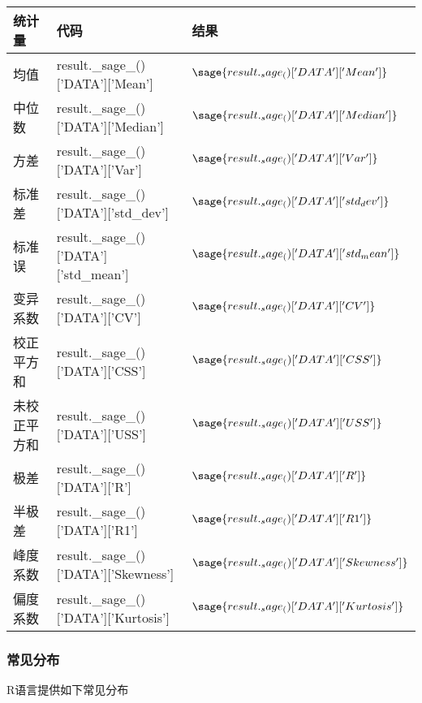 \begin{tabular}{lll}
\hline
统计量 & 代码 & 结果 \\
\hline
均值 & result.\_sage\_()['DATA']['Mean'] & $\sage{result._sage_()['DATA']['Mean']}$ \\
中位数 & result.\_sage\_()['DATA']['Median'] & $\sage{result._sage_()['DATA']['Median']}$ \\
方差 & result.\_sage\_()['DATA']['Var'] & $\sage{result._sage_()['DATA']['Var']}$ \\
标准差 & result.\_sage\_()['DATA']['std\_dev'] & $\sage{result._sage_()['DATA']['std_dev']}$ \\
标准误 & result.\_sage\_()['DATA']['std\_mean'] & $\sage{result._sage_()['DATA']['std_mean']}$ \\
变异系数 & result.\_sage\_()['DATA']['CV'] & $\sage{result._sage_()['DATA']['CV']}$ \\
校正平方和 & result.\_sage\_()['DATA']['CSS'] & $\sage{result._sage_()['DATA']['CSS']}$ \\
未校正平方和 & result.\_sage\_()['DATA']['USS'] & $\sage{result._sage_()['DATA']['USS']}$ \\
极差 & result.\_sage\_()['DATA']['R'] & $\sage{result._sage_()['DATA']['R']}$ \\
半极差 & result.\_sage\_()['DATA']['R1'] & $\sage{result._sage_()['DATA']['R1']}$ \\
峰度系数 & result.\_sage\_()['DATA']['Skewness'] & $\sage{result._sage_()['DATA']['Skewness']}$ \\
偏度系数 & result.\_sage\_()['DATA']['Kurtosis'] & $\sage{result._sage_()['DATA']['Kurtosis']}$\\
\hline
\end{tabular}

\subsubsection{常见分布}
R语言提供如下常见分布

